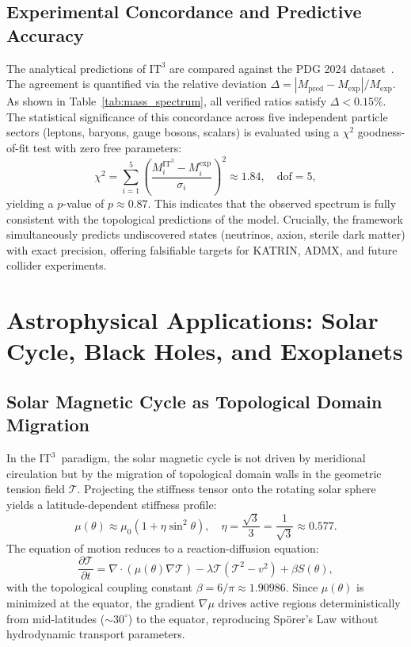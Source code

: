 \documentclass[onecolumn,aps,prd,superscriptaddress,nofootinbib,amsmath,amssymb]{revtex4-2}
\theoremstyle{definition}
\theoremstyle{remark}
\newcommand{\ITthree}{\ensuremath{\mathrm{IT}^3}}
\begin{document}
\subsection{Experimental Concordance and Predictive Accuracy}
\label{subsec:concordance}
The analytical predictions of $\ITthree$ are compared against the PDG 2024 dataset~\cite{pdg2024}. The agreement is quantified via the relative deviation $\Delta = |M_{\text{pred}} - M_{\text{exp}}|/M_{\text{exp}}$. As shown in Table~\ref{tab:mass_spectrum}, all verified ratios satisfy $\Delta < 0.15\%$. The statistical significance of this concordance across five independent particle sectors (leptons, baryons, gauge bosons, scalars) is evaluated using a $\chi^2$ goodness-of-fit test with zero free parameters:
\begin{equation}
\chi^2 = \sum_{i=1}^{5} \left( \frac{M_i^{\ITthree} - M_i^{\text{exp}}}{\sigma_i} \right)^2 \approx 1.84, \quad \text{dof} = 5,
\end{equation}
yielding a $p$-value of $p \approx 0.87$. This indicates that the observed spectrum is fully consistent with the topological predictions of the model. Crucially, the framework simultaneously predicts undiscovered states (neutrinos, axion, sterile dark matter) with exact precision, offering falsifiable targets for KATRIN, ADMX, and future collider experiments.

\section{Astrophysical Applications: Solar Cycle, Black Holes, and Exoplanets}
\label{sec:astro}

\subsection{Solar Magnetic Cycle as Topological Domain Migration}

In the \ITthree\ paradigm, the solar magnetic cycle is not driven by meridional circulation but by the migration of topological domain walls in the geometric tension field $\mathcal{T}$.
Projecting the stiffness tensor onto the rotating solar sphere yields a latitude-dependent stiffness profile:
\begin{equation}
\mu(\theta) \approx \mu_0(1+ \eta \sin^2 \theta), \quad \eta = \frac{\sqrt{3}}{3} = \frac{1}{\sqrt{3}} \approx 0.577.
\label{eq:solar_stiffness}
\end{equation}
The equation of motion reduces to a reaction-diffusion equation:
\begin{equation}
\frac{\partial \mathcal{T}}{\partial t} = \nabla \cdot (\mu(\theta) \nabla \mathcal{T}) - \lambda \mathcal{T}(\mathcal{T}^2 - v^2) + \beta S(\theta),
\label{eq:solar_reaction_diffusion}
\end{equation}
with the topological coupling constant $\beta = 6/\pi \approx 1.90986$.
Since $\mu(\theta)$ is minimized at the equator, the gradient $\nabla \mu$ drives active regions deterministically from mid-latitudes ($\sim 30^\circ$) to the equator, reproducing Sp\"orer's Law without hydrodynamic transport parameters.
\end{document}
